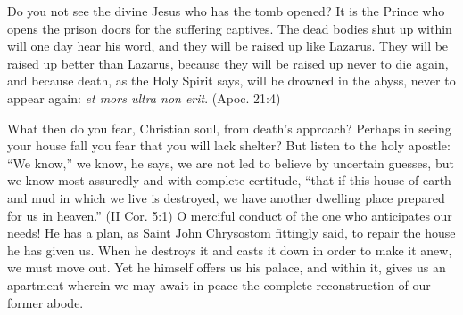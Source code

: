 \documentclass[10pt, twoside]{article}
\begin{document}
Do you not see the divine Jesus who has the tomb opened? It is the Prince who opens the prison doors for the suffering captives. The dead bodies shut up within will one day hear his word, and they will be raised up like Lazarus. They will be raised up better than Lazarus, because they will be raised up never to die again, and because death, as the Holy Spirit says, will be drowned in the abyss, never to appear again: \textit{et mors ultra non erit}. (Apoc. 21:4)

What then do you fear, Christian soul, from death's approach? Perhaps in seeing your house fall you fear that you will lack shelter? But listen to the holy apostle: ``We know,'' we know, he says, we are not led to believe by uncertain guesses, but we know most assuredly and with complete certitude, ``that if this house of earth and mud in which we live is destroyed, we have another dwelling place prepared for us in heaven.'' (II Cor. 5:1) O merciful conduct of the one who anticipates our needs! He has a plan, as Saint John Chrysostom fittingly said, to repair the house he has given us. When he destroys it and casts it down in order to make it anew, we must move out. Yet he himself offers us his palace, and within it, gives us an apartment wherein we may await in peace the complete reconstruction of our former abode.
\end{document}
